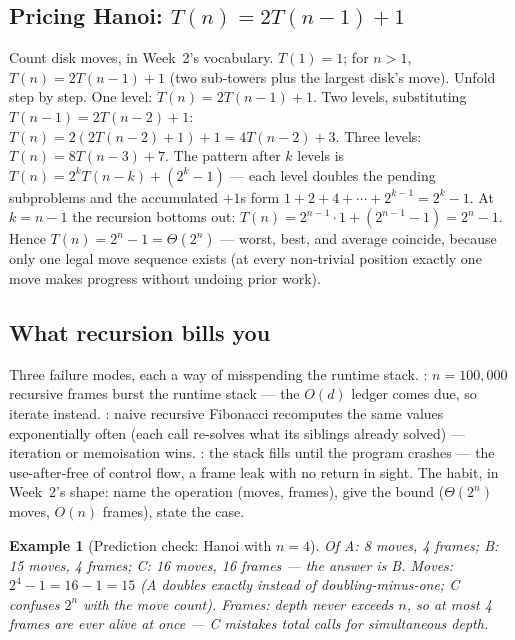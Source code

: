\documentclass[11pt]{article}
\newtheorem{example}{Example}[section]
\begin{document}
\subsection{Pricing Hanoi: \texorpdfstring{$T(n) = 2T(n-1) + 1$}{T(n) = 2T(n-1) + 1}}

Count disk moves, in Week~2's vocabulary. $T(1) = 1$; for $n > 1$, $T(n) = 2T(n-1) + 1$ (two sub-towers plus the largest disk's move). Unfold step by step. One level: $T(n) = 2T(n-1) + 1$. Two levels, substituting $T(n-1) = 2T(n-2) + 1$: $T(n) = 2(2T(n-2)+1) + 1 = 4T(n-2) + 3$. Three levels: $T(n) = 8T(n-3) + 7$. The pattern after $k$ levels is $T(n) = 2^{k}T(n-k) + (2^{k} - 1)$ --- each level doubles the pending subproblems and the accumulated $+1$s form $1 + 2 + 4 + \cdots + 2^{k-1} = 2^{k} - 1$. At $k = n - 1$ the recursion bottoms out: $T(n) = 2^{n-1} \cdot 1 + (2^{n-1} - 1) = 2^{n} - 1$. Hence $T(n) = 2^{n} - 1 = \Theta(2^{n})$ --- worst, best, and average coincide, because only one legal move sequence exists (at every non-trivial position exactly one move makes progress without undoing prior work). 

\subsection{What recursion bills you}

Three failure modes, each a way of misspending the runtime stack. : $n = 100{,}000$ recursive frames burst the runtime stack --- the $O(d)$ ledger comes due, so iterate instead. : naive recursive Fibonacci recomputes the same values exponentially often (each call re-solves what its siblings already solved) --- iteration or memoisation wins. : the stack fills until the program crashes --- the use-after-free of control flow, a frame leak with no return in sight. The habit, in Week~2's shape: name the operation (moves, frames), give the bound ($\Theta(2^{n})$ moves, $O(n)$ frames), state the case.

\begin{example}[Prediction check: Hanoi with $n = 4$]
Of A: 8 moves, 4 frames; B: 15 moves, 4 frames; C: 16 moves, 16 frames --- the answer is B. Moves: $2^{4} - 1 = 16 - 1 = 15$ (A doubles exactly instead of doubling-minus-one; C confuses $2^{n}$ with the move count). Frames: depth never exceeds $n$, so at most 4 frames are ever alive at once --- C mistakes total calls for simultaneous depth. 
\end{example}
\end{document}
